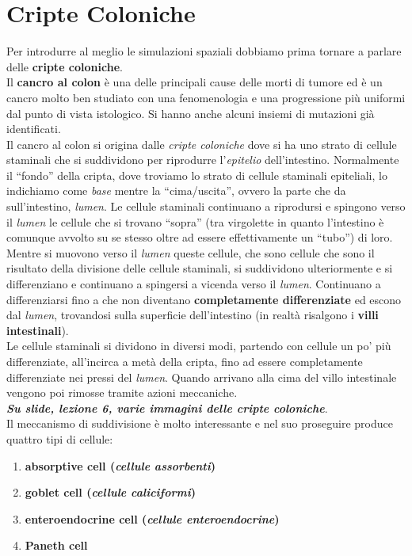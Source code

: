 \documentclass[a4paper,12pt, oneside]{book}
\begin{document}
\section{Cripte Coloniche}
Per introdurre al meglio le simulazioni spaziali dobbiamo prima tornare a
parlare delle \textbf{cripte coloniche}.\\
Il \textbf{cancro al colon} è una delle principali cause delle morti di tumore
ed è un cancro molto ben studiato con una fenomenologia e una progressione più
uniformi dal punto di vista istologico. Si hanno anche alcuni insiemi di
mutazioni già identificati. \\
Il cancro al colon si origina dalle \textit{cripte coloniche} dove si ha uno
strato di cellule staminali che si suddividono per riprodurre
l'\textit{epitelio} dell'intestino. Normalmente il ``fondo'' della cripta, dove
troviamo lo strato di cellule staminali epiteliali, lo indichiamo come
\textit{base} mentre la ``cima/uscita'', ovvero la parte che da sull'intestino,
\textit{lumen}. Le cellule staminali continuano a riprodursi e spingono verso
il \textit{lumen} le cellule che si trovano ``sopra'' (tra virgolette in quanto
l'intestino è comunque avvolto su se stesso oltre ad essere effettivamente un
``tubo'') di loro. Mentre si muovono 
verso il \textit{lumen} queste cellule, che sono cellule che sono il risultato
della divisione delle cellule staminali, si suddividono ulteriormente e si
differenziano e continuano a spingersi a vicenda verso il
\textit{lumen}. Continuano a differenziarsi fino a che non diventano
\textbf{completamente differenziate} ed escono dal \textit{lumen}, trovandosi
sulla superficie dell'intestino (in realtà risalgono i \textbf{villi
  intestinali}). \\
Le cellule staminali si dividono in diversi modi, partendo con cellule un po'
più differenziate, all'incirca a metà della cripta, fino ad essere completamente
differenziate nei pressi del \textit{lumen}. Quando arrivano alla cima del villo
intestinale vengono poi rimosse tramite azioni meccaniche. \\
\textbf{\textit{Su slide, lezione 6, varie immagini delle cripte coloniche}}.\\
Il meccanismo di suddivisione è molto interessante e nel suo proseguire produce
quattro tipi di cellule:
\begin{enumerate}
  \item \textbf{absorptive cell (\textit{cellule assorbenti})}
  \item \textbf{goblet cell (\textit{cellule caliciformi})}
  \item \textbf{enteroendocrine cell (\textit{cellule enteroendocrine})}
  \item \textbf{Paneth cell}
\end{enumerate}
\end{document}

